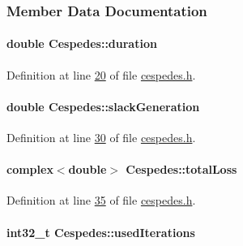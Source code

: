 \subsubsection{Member Data Documentation}
\hypertarget{class_cespedes_a815e35adbc446c937d164186a634b5a0}{}
\paragraph[{duration}]{\setlength{\rightskip}{0pt plus 5cm}double Cespedes\+::duration}\label{class_cespedes_a815e35adbc446c937d164186a634b5a0}


Definition at line \hyperlink{cespedes_8h_source_l00020}{20} of file \hyperlink{cespedes_8h_source}{cespedes.\+h}.

\hypertarget{class_cespedes_a74591c697b8b471f6c0450a561d30591}{}
\paragraph[{slack\+Generation}]{\setlength{\rightskip}{0pt plus 5cm}double Cespedes\+::slack\+Generation}\label{class_cespedes_a74591c697b8b471f6c0450a561d30591}


Definition at line \hyperlink{cespedes_8h_source_l00030}{30} of file \hyperlink{cespedes_8h_source}{cespedes.\+h}.

\hypertarget{class_cespedes_ae1a95c3c22fff9c230fd528d9b191966}{}
\paragraph[{total\+Loss}]{\setlength{\rightskip}{0pt plus 5cm}complex$<$double$>$ Cespedes\+::total\+Loss}\label{class_cespedes_ae1a95c3c22fff9c230fd528d9b191966}


Definition at line \hyperlink{cespedes_8h_source_l00035}{35} of file \hyperlink{cespedes_8h_source}{cespedes.\+h}.

\hypertarget{class_cespedes_a28bead7e9c77462986e1471c50294d9e}{}
\paragraph[{used\+Iterations}]{\setlength{\rightskip}{0pt plus 5cm}int32\+\_\+t Cespedes\+::used\+Iterations}\label{class_cespedes_a28bead7e9c77462986e1471c50294d9e}



